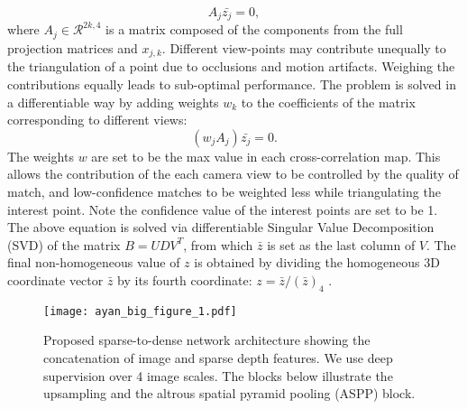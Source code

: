 \documentclass[runningheads]{llncs}
\begin{document}
\begin{equation}\label{advce2}
  A_j \bar{z_j} =0, 
\end{equation}
where $A_j \in \mathcal{R}^{2k,4}$ is a matrix composed of the components from the full projection matrices and $x_{j,k}$. Different view-points may contribute unequally to the triangulation of a point due to occlusions and motion artifacts. Weighing the contributions equally leads to sub-optimal performance. The problem is solved in a differentiable way by adding weights $w_k$ to the coefficients of the matrix corresponding to different views:
\begin{equation}\label{advce2}
  (w_j A_j) \bar{z_j}=0. 
\end{equation}
The weights $w$ are set to be the max value in each cross-correlation map. This allows the contribution of the each camera view to be controlled by the quality of match, and low-confidence matches to be weighted less while triangulating the interest point. Note the confidence value of the interest points are set to be 1. The above equation is solved via differentiable Singular Value Decomposition (SVD) of the matrix $B = UDV^T$, from which $\bar{z}$ is set as the last column of $V$. The final non-homogeneous value of $z$ is obtained by dividing the homogeneous 3D coordinate vector $\bar{z}$ by its fourth coordinate: $z = \bar{z}/(\bar{z})_4$ \cite{iskakov2019learnable}. 








\begin{figure}
\centering
\texttt{[image: ayan\_big\_figure\_1.pdf]}
\caption{Proposed sparse-to-dense network architecture showing the concatenation of image and sparse depth features. We use deep supervision over 4 image scales. The blocks below illustrate the upsampling and the altrous spatial pyramid pooling (ASPP) block.} 
\label{sparse2dense}
\end{figure}
\end{document}
